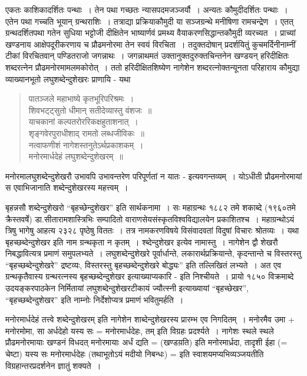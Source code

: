 {एकतः काशिकादर्शितः पन्थाः~। तेन पथा गच्छतः न्यासपदमजञ्जर्यौ~। अन्यतः कौमुदीदर्शितः पन्थाः~। एतेन पथा गच्चति भूयान् ग्रन्थराशिः~। तत्राद्या प्रक्रियाकौमुदी या सञ्जग्रन्थे मनीषिणा रामचन्द्रेण~। एतत् ग्रन्थदर्शितपथा गतेन सुधिया भट्टोजी दीक्षितेन भाष्यार्णवं प्रमथ्य वैयाकरणसिद्धान्तकौमुदी व्यरच्यत~। प्राच्यां खण्डनाय आक्षेपदूरीकरणाय च प्रौढमनोरमा तेन स्वयं विरचिता~। तदुक्तदोषान् प्रदर्शयितुं कुचमर्दिनीनाम्नीं टीकां विरचितवान् पण्डितराजो जगन्नाथः~। जगन्नाथमतं उक्तानुक्तदुरुक्तचिन्तनेन खण्डयन् हरिदीक्षितः शब्दरत्नेन प्रौढमनोरमामलमकोरोत्~। ततो हरिदीक्षितशिष्येण नागेशेन शब्दरत्नोक्तन्यूनता परिहाराय कौमुद्या व्याख्यानभूतो लघुशब्देन्दुशेखरः प्राणायि - यथा 

\begin{verse}
पातञ्जले महाभाष्ये कृतभूरिपरिश्रमः~। \\
शिवभट्ट्सुतो धीमान् सतीदेव्यास्तु वंशजः~॥\\
याचकानां कल्पतरोररिकक्षहुताशनात्~। \\
शृङ्गवेरपुराधीशाद् रामतो लब्धजीविकः~॥\\
नत्वाफणीशं नागेशस्तनुतेऽर्थप्रकाशकम्~। \\
मनोरमार्धदेहं लघुशब्देन्दुशेखरम्~॥
\end{verse}

मनोरमालघुशब्देन्दुशेखरौ उभावपि उभावन्तरेण परिपूर्णतां न यातः - इत्यवगन्तव्यम्~। योऽधीती प्रौढमनोरमायां स एवाभिजानाति शब्देन्दुशेखरस्य महत्त्वम्~। 

बृहन्नसौ शब्देन्दुशेखरो “बृहच्छेन्दुशेखर” इति सार्थकनामा~। सः महाग्रन्थः १८८२ तमे शकाब्दे (१९६०तमे क्रैस्तवर्षे) डा.सीतारामशास्त्रिभिः सम्पादितो वाराणसेयसंस्कृत\-विश्वविद्यालयेन प्रकाशितश्च~। महाग्रन्थोऽयं त्रिषु भागेषु आहत्य २३२८ पृष्ठेषु विततः~। तत्र नामकरणविषये विसंवादवतां विदुषां विचारः श्रोतव्यः~। यथा बृहच्छब्देन्दुशेखर इति नाम ग्रन्थकृता न कृतम्~। श्ब्देन्दुशेखर इत्येव नामास्तु~। नागेशेन द्वौ शेखरौ निबद्धावित्यत्र प्रमाणं समुपलभ्यते~। लघुशब्देन्दुशेखरे पूर्वार्धान्ते, लकारार्थप्रक्रियान्ते, कृदन्तान्ते च विस्तरस्तु “बृहच्छब्देन्दुशेखरे” द्रष्टव्यः, विस्तरस्तु बृहच्छब्देन्दुशेखरे बोद्ध्यः” इति तल्लिखितं लभ्यते~। अत एव ग्रन्थकृतैवास्य ग्रन्थरत्नस्य बृहच्छब्देन्दुशेखर इत्याख्याप्यकारि - इति निश्चीयते~। प्रायो १८५० विक्रमाब्दे उदयङ्करपाठकेन निर्मितायां लघुशब्देन्दुशेखरटीकायं ज्यौत्स्नी इत्याख्यायां “बृहच्छेखर”, “बृहच्छब्देन्दुशेखर” इति नाम्नोः निर्देशोप्यत्र प्रमाणं भवितुमर्हति~। 

मनोरमार्धदेहं तत्त्वे शब्देन्दुशेखरम् इति नागेशेन शाब्देन्दुशेखरस्य प्रारम्भ एव निगदितम्~। मनोरमैव उमा + मनोरमोमा, सा अर्धदेहो यस्य सः = मनोरमार्धदेहः, तम् इति विग्रहः प्रदर्श्यते~। नागेशः स्थले स्थले प्रौढमनोरमायाः खण्डनं विधदत् मनोरमायाः अर्धं द्यति = (खण्डय़ति) इति मनोरमार्ध्रदा, तादृशी ईहा (= चेष्टा) यस्य सः मनोरमार्धदेहः (तथाभूतोऽयं मदीयो निबन्धः) = इति स्वाशयमप्यभिव्यञ्जयतीति विग्रहान्तरप्रदर्शनेन ज्ञातुं शक्यते~। 

}
